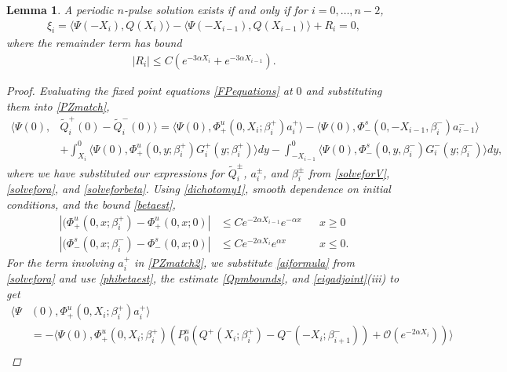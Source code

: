 \documentclass[12pt]{elsarticle}
\theoremstyle{plain}
\newtheorem{lemma}[theorem]{Lemma}
\theoremstyle{definition}
\theoremstyle{remark}
\numberwithin{theorem}{section}
\numberwithin{equation}{section}
\begin{document}
\begin{lemma}\label{jumplemma1}
A periodic $n$-pulse solution exists if and only if for $i = 0, \dots, n-2$,
\begin{align}\label{jumpcond2}
\xi_i = \langle \Psi(-X_i), Q(X_i) \rangle - \langle \Psi(-X_{i-1}), Q(X_{i-1}) \rangle + R_i = 0,
\end{align}
where the remainder term has bound
\begin{align*}
|R_i| \leq C ( e^{-3 \alpha X_i} +  e^{-3 \alpha X_{i-1}}).
\end{align*}
\begin{proof}
Evaluating the fixed point equations \cref{FPequations} at $0$ and substituting them into \cref{PZmatch},
\begin{equation}\label{PZmatch2}
\begin{aligned}
\langle \Psi(0), &\tilde{Q}_i^+(0) - \tilde{Q}_i^-(0) \rangle = \langle \Psi(0), \Phi^u_+(0, X_i; \beta_i^+) a_i^+ \rangle
- \langle \Psi(0), \Phi^s_-(0, -X_{i-1}, \beta_i^-) a_{i-1}^- \rangle \\
&+ \int_{X_i}^0 \langle \Psi(0), \Phi_+^u(0, y; \beta_i^+) G_i^+(y; \beta_i^+) \rangle dy - \int_{-X_{i-1}}^0 \langle \Psi(0), \Phi_-^s(0, y, \beta_i^-) G_i^-(y; \beta_i^-) \rangle dy,
\end{aligned}
\end{equation}
where we have substituted our expressions for $\tilde{Q}_i^\pm$, $a_i^\pm$, and $\beta_i^\pm$ from \cref{solveforV}, \cref{solvefora}, and \cref{solveforbeta}. Using \cref{dichotomy1}, smooth dependence on initial conditions, and the bound \cref{betaest},
\begin{equation}\label{phibetaest}
\begin{aligned}
|(\Phi_+^u(0, x; \beta_i^+) - \Phi_+^u(0, x; 0)| &\leq C e^{-2 \alpha X_{i-1}} e^{-\alpha x} && x \geq 0\\
|(\Phi_-^s(0, x; \beta_i^-) - \Phi_-^s(0, x; 0)| &\leq C e^{-2 \alpha X_i}e^{\alpha x} &&  x \leq 0.
\end{aligned}
\end{equation}
For the term involving $a_i^+$ in \cref{PZmatch2}, we substitute \cref{aiformula} from \cref{solvefora} and use \cref{phibetaest}, the estimate \cref{Qpmbounds}, and \cref{eigadjoint}(iii) to get
\begin{align*}
\langle \Psi&(0), \Phi^u_+(0, X_i; \beta_i^+) a_i^+ \rangle \\
&= -\langle \Psi(0), \Phi^u_+(0, X_i; \beta_i^+)( P^u_0 ( Q^+(X_i; \beta_i^+) - Q^-(-X_i; \beta_{i+1}^-)) + \mathcal{O}( e^{-2 \alpha X_i} ) ) \rangle \\

\end{align*}
\end{proof}
\end{lemma}
\end{document}
